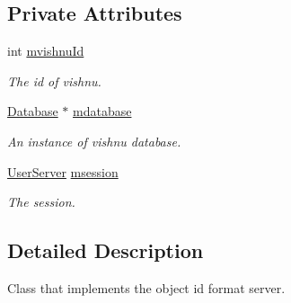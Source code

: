 \subsection*{Private Attributes}
\begin{DoxyCompactItemize}
\item 
\hypertarget{classObjectIdServer_ae6bbd68d6467eebcc03d4f8186a5a6bf}{
int \hyperlink{classObjectIdServer_ae6bbd68d6467eebcc03d4f8186a5a6bf}{mvishnuId}}
\label{classObjectIdServer_ae6bbd68d6467eebcc03d4f8186a5a6bf}

\begin{DoxyCompactList}\small\item\em The id of vishnu. \item\end{DoxyCompactList}\item 
\hypertarget{classObjectIdServer_a91265e74fb54703ae8a6d9e808008348}{
\hyperlink{classDatabase}{Database} $\ast$ \hyperlink{classObjectIdServer_a91265e74fb54703ae8a6d9e808008348}{mdatabase}}
\label{classObjectIdServer_a91265e74fb54703ae8a6d9e808008348}

\begin{DoxyCompactList}\small\item\em An instance of vishnu database. \item\end{DoxyCompactList}\item 
\hypertarget{classObjectIdServer_a1212edbf78054facded05afeeb323531}{
\hyperlink{classUserServer}{UserServer} \hyperlink{classObjectIdServer_a1212edbf78054facded05afeeb323531}{msession}}
\label{classObjectIdServer_a1212edbf78054facded05afeeb323531}

\begin{DoxyCompactList}\small\item\em The session. \item\end{DoxyCompactList}\end{DoxyCompactItemize}


\subsection{Detailed Description}
Class that implements the object id format server. 

